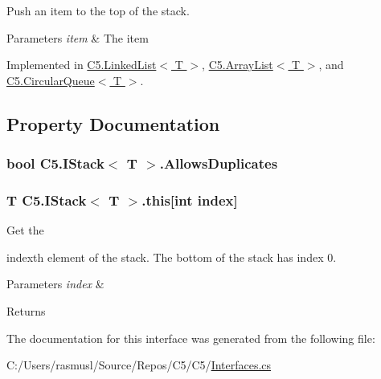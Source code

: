 Push an item to the top of the stack. 


\begin{DoxyParams}{Parameters}
{\em item} & The item\\
\hline
\end{DoxyParams}


Implemented in \hyperlink{class_c5_1_1_linked_list_a68cbe5dea51155f445ed4122d6179e7a}{C5.\+Linked\+List$<$ T $>$}, \hyperlink{class_c5_1_1_array_list_a1eb4d5aadf670338e6402bf27fdc1b3a}{C5.\+Array\+List$<$ T $>$}, and \hyperlink{class_c5_1_1_circular_queue_a03b6cfbe23af1164ef4b68db24698ce7}{C5.\+Circular\+Queue$<$ T $>$}.



\subsection{Property Documentation}
\hypertarget{interface_c5_1_1_i_stack_a1c4090df5f9382ceb912e26da65192fa}{}
\subsubsection[{Allows\+Duplicates}]{\setlength{\rightskip}{0pt plus 5cm}bool {\bf C5.\+I\+Stack}$<$ T $>$.Allows\+Duplicates\hspace{0.3cm}{\ttfamily [get]}}\label{interface_c5_1_1_i_stack_a1c4090df5f9382ceb912e26da65192fa}




\hypertarget{interface_c5_1_1_i_stack_a38a9bdc0918c936c3b6fd78b3d68cdf1}{}
\subsubsection[{this[int index]}]{\setlength{\rightskip}{0pt plus 5cm}T {\bf C5.\+I\+Stack}$<$ T $>$.this\mbox{[}int index\mbox{]}\hspace{0.3cm}{\ttfamily [get]}}\label{interface_c5_1_1_i_stack_a38a9bdc0918c936c3b6fd78b3d68cdf1}


Get the 

{\ttfamily index}\textquotesingle{}th element of the stack. The bottom of the stack has index 0. 


\begin{DoxyParams}{Parameters}
{\em index} & \\
\hline
\end{DoxyParams}
\begin{DoxyReturn}{Returns}

\end{DoxyReturn}


The documentation for this interface was generated from the following file\+:\begin{DoxyCompactItemize}
\item 
C\+:/\+Users/rasmusl/\+Source/\+Repos/\+C5/\+C5/\hyperlink{_interfaces_8cs}{Interfaces.\+cs}\end{DoxyCompactItemize}
